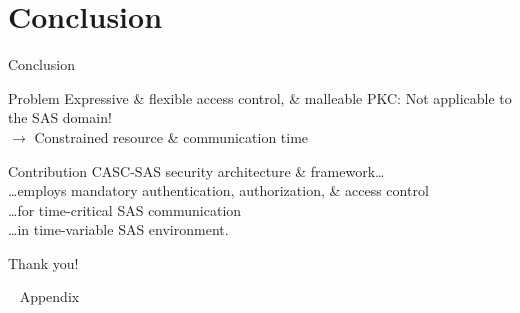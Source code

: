 \documentclass[en]{sdqbeamer}
\begin{document}
\section{Conclusion}
\begin{frame}{Conclusion}
    \begin{redblock}{Problem}
        Expressive \& flexible access control, \& malleable PKC: Not applicable to the SAS domain!
        \\$\rightarrow$ Constrained resource \& communication time
    \end{redblock}
    \begin{blueblock}{Contribution}
        CASC-SAS security architecture \& framework\dots
        \\\dots employs mandatory authentication, authorization, \& access control
        \\\dots for time-critical SAS communication
        \\\dots in time-variable SAS environment.
    \end{blueblock}
    \vspace{0.5em}
    \centering
    \huge
    Thank you!
\end{frame}

\appendix
\beginbackup
\begin{frame}{~}
    \centering
    \huge
    Appendix
\end{frame}
\end{document}
